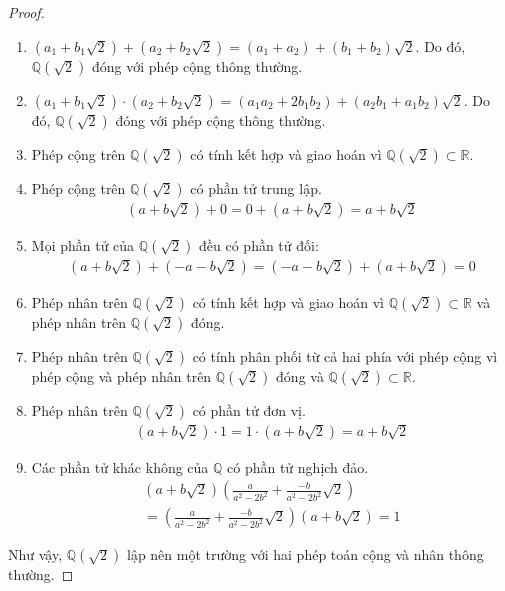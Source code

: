 \begin{proof}
    \begin{enumerate}[label = (\roman*)]
        \item $(a_{1} + b_{1}\sqrt{2}) + (a_{2} + b_{2}\sqrt{2}) = (a_{1} + a_{2}) + (b_{1} + b_{2})\sqrt{2}$. Do đó, $\mathbb{Q}(\sqrt{2})$ đóng với phép cộng thông thường.
        \item $(a_{1} + b_{1}\sqrt{2}) \cdot (a_{2} + b_{2}\sqrt{2}) = (a_{1}a_{2} + 2b_{1}b_{2}) + (a_{2}b_{1} + a_{1}b_{2})\sqrt{2}$. Do đó, $\mathbb{Q}(\sqrt{2})$ đóng với phép cộng thông thường.
        \item Phép cộng trên $\mathbb{Q}(\sqrt{2})$ có tính kết hợp và giao hoán vì $\mathbb{Q}(\sqrt{2})\subset\mathbb{R}$.
        \item Phép cộng trên $\mathbb{Q}(\sqrt{2})$ có phần tử trung lập.
              \begin{gather*}
                  (a + b\sqrt{2}) + 0 = 0 + (a + b\sqrt{2}) = a + b\sqrt{2}
              \end{gather*}
        \item Mọi phần tử của $\mathbb{Q}(\sqrt{2})$ đều có phần tử đối:
              \begin{gather*}
                  (a + b\sqrt{2}) + (-a - b\sqrt{2}) = (-a - b\sqrt{2}) + (a + b\sqrt{2}) = 0
              \end{gather*}
        \item Phép nhân trên $\mathbb{Q}(\sqrt{2})$ có tính kết hợp và giao hoán vì $\mathbb{Q}(\sqrt{2})\subset\mathbb{R}$ và phép nhân trên $\mathbb{Q}(\sqrt{2})$ đóng.
        \item Phép nhân trên $\mathbb{Q}(\sqrt{2})$ có tính phân phối từ cả hai phía với phép cộng vì phép cộng và phép nhân trên $\mathbb{Q}(\sqrt{2})$ đóng và $\mathbb{Q}(\sqrt{2})\subset\mathbb{R}$.
        \item Phép nhân trên $\mathbb{Q}(\sqrt{2})$ có phần tử đơn vị.
              \begin{gather*}
                  (a + b\sqrt{2})\cdot 1 = 1\cdot (a + b\sqrt{2}) = a + b\sqrt{2}
              \end{gather*}
        \item Các phần tử khác không của $\mathbb{Q}$ có phần tử nghịch đảo.
              \begin{gather*}
                  (a + b\sqrt{2})\left(\frac{a}{a^{2} - 2b^{2}} + \frac{-b}{a^{2}-2b^{2}}\sqrt{2}\right) \\
                  =\left(\frac{a}{a^{2} - 2b^{2}} + \frac{-b}{a^{2}-2b^{2}}\sqrt{2}\right)(a + b\sqrt{2}) = 1
              \end{gather*}
    \end{enumerate}
    
    Như vậy, $\mathbb{Q}(\sqrt{2})$ lập nên một trường với hai phép toán cộng và nhân thông thường.
\end{proof}

